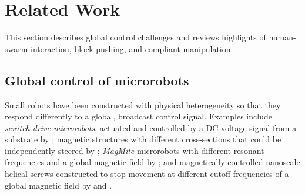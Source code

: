 

\section{Related Work}\label{sec:RelatedWork}
This section describes global control challenges and reviews highlights of human-swarm interaction, block pushing, and compliant manipulation.


\subsection{Global control of microrobots}
Small robots have been constructed with physical heterogeneity so that they respond differently to a global, broadcast control signal.  Examples include \emph{scratch-drive microrobots}, actuated and controlled by a DC voltage signal from a substrate by \cite{Donald2006,Donald2008};   magnetic structures  with different cross-sections that could be independently steered by \cite{Floyd2011,Diller2013};   \emph{MagMite} microrobots with different resonant frequencies and a global magnetic field by \cite{Frutiger2008}; and  magnetically controlled nanoscale helical screws constructed to stop movement at different cutoff frequencies of a global magnetic field by
\cite{Tottori2012} and \cite{Peyer2013}. 

